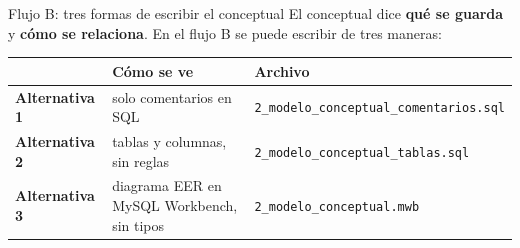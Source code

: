 \documentclass[aspectratio=169,10pt,c]{beamer}
\begin{document}
\begin{frame}{Flujo B: tres formas de escribir el conceptual}
\small El conceptual dice \textbf{qué se guarda} y \textbf{cómo se relaciona}. En el flujo B se puede escribir de tres maneras:
\vspace{0.3cm}
\begin{center}
\renewcommand{\arraystretch}{1.45}
\begin{tabular}{@{}>{\bfseries}l>{\raggedright}p{3.9cm}>{\raggedright\arraybackslash}p{6.2cm}@{}}
\toprule
& \bfseries Cómo se ve & \bfseries Archivo \\
\midrule
Alternativa 1 & solo comentarios en SQL & \texttt{2\_modelo\_conceptual\_comentarios.sql} \\
Alternativa 2 & tablas y columnas, sin reglas & \texttt{2\_modelo\_conceptual\_tablas.sql} \\
Alternativa 3 & diagrama EER en MySQL Workbench, sin tipos & \texttt{2\_modelo\_conceptual.mwb} \\
\bottomrule
\end{tabular}
\end{center}
\vspace{0.3cm}
\end{frame}
\end{document}
